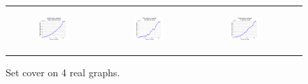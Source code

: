 \begin{figure}[ht]
\begin{tabular}{cccc}
	  \begin{subfigure}[b]{0.22\textwidth}
	  	\includegraphics[width=110pt]{images/validated_CC2G_arabic2005_setcover.png}
			\caption{}
			\label{appfig:validated_CC2G_arabic2005_setcover}
	  \end{subfigure} &
	  \begin{subfigure}[b]{0.22\textwidth}
	  	\includegraphics[width=110pt]{images/validated_CC2G_uk2005_setcover.png}
			\caption{}
			\label{appfig:validated_CC2G_uk2005_setcover}
	  \end{subfigure} &
	  \begin{subfigure}[b]{0.22\textwidth}
	  	\includegraphics[width=110pt]{images/validated_CC2G_it2004_setcover.png}
			\caption{}
			\label{appfig:validated_CC2G_it2004_setcover}
	  \end{subfigure} \\
  \end{tabular}
  \caption{Set cover on 4 real graphs.}
\end{figure}



